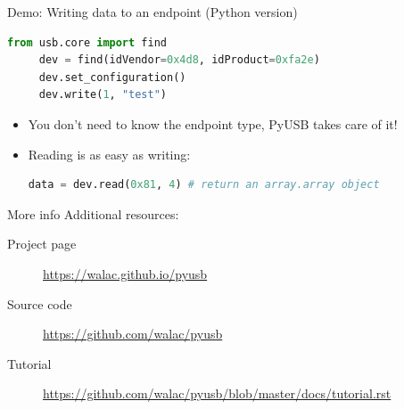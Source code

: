 \documentclass[pdf]{beamer}
\begin{document}
\begin{frame}[fragile]{Demo: Writing data to an endpoint (Python version)}
  \small
  \pause
  \begin{lstlisting}[language=Python]
     from usb.core import find
     dev = find(idVendor=0x4d8, idProduct=0xfa2e)
     dev.set_configuration()
     dev.write(1, "test")
  \end{lstlisting}

  \begin{itemize}
    \small
    \pause
    \item You don't need to know the endpoint type, PyUSB takes care of it!
    \pause
    \item Reading is as easy as writing:
    \begin{lstlisting}[language=Python]
      data = dev.read(0x81, 4) # return an array.array object
    \end{lstlisting}
  \end{itemize}
\end{frame}

\begin{frame}{More info}
  Additional resources:
  \begin{description}
    \item[Project page] \url{https://walac.github.io/pyusb}
    \item[Source code] \url{https://github.com/walac/pyusb}
    \item[Tutorial] \url{https://github.com/walac/pyusb/blob/master/docs/tutorial.rst}
  \end{description}
\end{frame}
\end{document}
